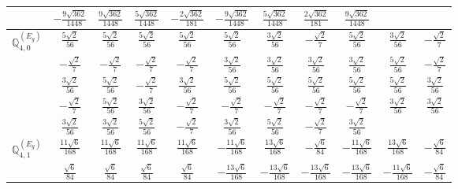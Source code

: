 \documentclass[fleqn,10pt,landscape]{article}
\begin{document}
\begin{itemize}
{\begin{center}
\begin{longtable}{ccccccccccc}
& $ - \frac{9 \sqrt{362}}{1448} $ & $ \frac{9 \sqrt{362}}{1448} $ & $ \frac{5 \sqrt{362}}{1448} $ & $ - \frac{2 \sqrt{362}}{181} $ & $ - \frac{9 \sqrt{362}}{1448} $ & $ \frac{5 \sqrt{362}}{1448} $ & $ \frac{2 \sqrt{362}}{181} $ & $ \frac{9 \sqrt{362}}{1448} $ & $  $ & $  $ \\ \hline
$\mathbb{Q}_{4,0}^{(E_{g})}$ & $ \frac{5 \sqrt{2}}{56} $ & $ \frac{5 \sqrt{2}}{56} $ & $ \frac{5 \sqrt{2}}{56} $ & $ \frac{5 \sqrt{2}}{56} $ & $ \frac{5 \sqrt{2}}{56} $ & $ \frac{3 \sqrt{2}}{56} $ & $ - \frac{\sqrt{2}}{7} $ & $ \frac{5 \sqrt{2}}{56} $ & $ \frac{3 \sqrt{2}}{56} $ & $ - \frac{\sqrt{2}}{7} $ \\
& $ - \frac{\sqrt{2}}{7} $ & $ - \frac{\sqrt{2}}{7} $ & $ - \frac{\sqrt{2}}{7} $ & $ - \frac{\sqrt{2}}{7} $ & $ \frac{3 \sqrt{2}}{56} $ & $ \frac{3 \sqrt{2}}{56} $ & $ \frac{3 \sqrt{2}}{56} $ & $ \frac{3 \sqrt{2}}{56} $ & $ \frac{5 \sqrt{2}}{56} $ & $ - \frac{\sqrt{2}}{7} $ \\
& $ \frac{3 \sqrt{2}}{56} $ & $ \frac{5 \sqrt{2}}{56} $ & $ - \frac{\sqrt{2}}{7} $ & $ \frac{3 \sqrt{2}}{56} $ & $ \frac{5 \sqrt{2}}{56} $ & $ \frac{5 \sqrt{2}}{56} $ & $ \frac{5 \sqrt{2}}{56} $ & $ \frac{5 \sqrt{2}}{56} $ & $ \frac{5 \sqrt{2}}{56} $ & $ \frac{3 \sqrt{2}}{56} $ \\
& $ - \frac{\sqrt{2}}{7} $ & $ \frac{5 \sqrt{2}}{56} $ & $ \frac{3 \sqrt{2}}{56} $ & $ - \frac{\sqrt{2}}{7} $ & $ - \frac{\sqrt{2}}{7} $ & $ - \frac{\sqrt{2}}{7} $ & $ - \frac{\sqrt{2}}{7} $ & $ - \frac{\sqrt{2}}{7} $ & $ \frac{3 \sqrt{2}}{56} $ & $ \frac{3 \sqrt{2}}{56} $ \\
& $ \frac{3 \sqrt{2}}{56} $ & $ \frac{3 \sqrt{2}}{56} $ & $ \frac{5 \sqrt{2}}{56} $ & $ - \frac{\sqrt{2}}{7} $ & $ \frac{3 \sqrt{2}}{56} $ & $ \frac{5 \sqrt{2}}{56} $ & $ - \frac{\sqrt{2}}{7} $ & $ \frac{3 \sqrt{2}}{56} $ & $  $ & $  $ \\ \hline
$\mathbb{Q}_{4,1}^{(E_{g})}$ & $ \frac{11 \sqrt{6}}{168} $ & $ \frac{11 \sqrt{6}}{168} $ & $ \frac{11 \sqrt{6}}{168} $ & $ \frac{11 \sqrt{6}}{168} $ & $ - \frac{11 \sqrt{6}}{168} $ & $ \frac{13 \sqrt{6}}{168} $ & $ - \frac{\sqrt{6}}{84} $ & $ - \frac{11 \sqrt{6}}{168} $ & $ \frac{13 \sqrt{6}}{168} $ & $ - \frac{\sqrt{6}}{84} $ \\
& $ \frac{\sqrt{6}}{84} $ & $ \frac{\sqrt{6}}{84} $ & $ \frac{\sqrt{6}}{84} $ & $ \frac{\sqrt{6}}{84} $ & $ - \frac{13 \sqrt{6}}{168} $ & $ - \frac{13 \sqrt{6}}{168} $ & $ - \frac{13 \sqrt{6}}{168} $ & $ - \frac{13 \sqrt{6}}{168} $ & $ - \frac{11 \sqrt{6}}{168} $ & $ - \frac{\sqrt{6}}{84} $ \\

\end{longtable}
\end{center}}
\end{itemize}
\end{document}
